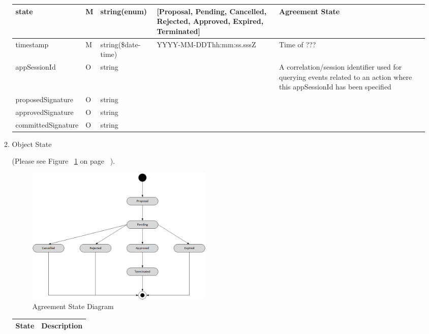 \begin{enumerate}
\begin{enumerate}
\begin{center}
\begin{tabular}{|p{3cm}|l|p{3cm}|p{3cm}|p{4cm}|}
state 				& M & string(enum) 				&[Proposal, Pending, Cancelled, Rejected, Approved, Expired, Terminated] & Agreement State \\
\hline

timestamp			& M	& 	string(\$date-time)	& YYYY-MM-DDThh:mm:ss.sssZ	&	Time of ???  \\
\hline

appSessionId		& O &	string 				&							& 	A correlation/session identifier used for querying events related to an action 
																				where this appSessionId has been specified		\\
\hline

proposedSignature 	& O & 	string 				&							&			\\
\hline

approvedSignature 	& O & 	string 				& 							&			\\
\hline

committedSignature	& O &	string 				& 							& 			\\
\hline

\end{tabular}
\end{center}

\item Object State

(Please see Figure ~\ref{fig:ASD} on page ~\pageref{fig:ASD}).

\begin{figure}[htbp]
    \centering
    \includegraphics[width=9cm,angle=0]{./diag/Reference/AgreementState-Reference.png}
	\caption{Agreement State Diagram}
    \label{fig:ASD}
\end{figure}


\begin{center}
\begin{tabular}{|p{3cm}|p{11cm}|} 
\hline
\rowcolor{lightgray}	State	& 	Description \\
\hline


\end{tabular}
\end{center}
\end{enumerate}
\end{enumerate}
